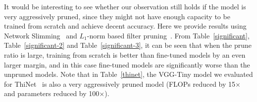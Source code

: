 It would be interesting to see whether our observation still holds if the model is very aggressively pruned, since they might not have enough capacity to be trained from scratch and achieve decent accuracy. Here we provide results using Network Slimming~\cite{liu2017learning} and $L_1$-norm based filter pruning~\cite{li2016pruning}.  From Table~\ref{significant}, Table~\ref{significant-2} and Table~\ref{significant-3}, it can be seen that when the prune ratio is large, training from scratch is better than fine-tuned models by an even larger margin, and in this case fine-tuned models are significantly worse than the unpruned models. Note that in Table~\ref{thinet}, the VGG-Tiny model we evaluated for ThiNet~\cite{luo2017thinet} is also a very aggressively pruned model (FLOPs reduced by 15$\times$ and parameters reduced by 100$\times$).
\setlength{\tabcolsep}{4pt}
\renewcommand{\arraystretch}{1.15}
\begin{table}[!htbp]
\centering
\small
\caption{Results for Network Slimming~\cite{liu2017learning} when the models are aggressively pruned. ``Prune ratio'' stands for total percentage of channels that are pruned in the whole network. Larger ratios are used than the original paper of~\cite{liu2017learning}. 
}
\label{significant}
\end{table}



